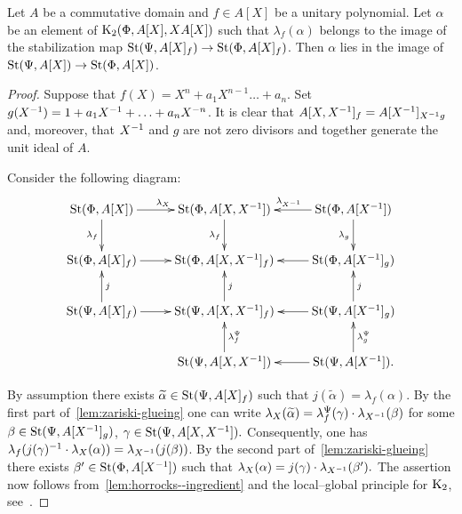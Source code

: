 \begin{lemma} \label{lem:horrocks-b}
 Let $A$ be a commutative domain and $f \in A[X]$ be a unitary polynomial.
 Let $\alpha$ be an element of $\operatorname{K}_2(\Phi, A[X], XA[X])$ such that $\lambda_f(\alpha)$ belongs to the image of the stabilization map
 $\operatorname{St}(\Psi, A[X]_f) \to \operatorname{St}(\Phi, A[X]_f)$.
 Then $\alpha$ lies in the image of $\operatorname{St}(\Psi, A[X]) \to \operatorname{St}(\Phi, A[X])$.
\end{lemma}
\begin{proof}
    Suppose that $f(X) = X^n + a_1 X^{n-1} \ldots + a_n$.
    Set $g(X^{-1}) = 1 + a_1 X^{-1} + \ldots + a_{n} X^{-n}$.
    It is clear that $A[X, X^{-1}]_f = A[X^{-1}]_{X^{-1} g}$ and, moreover, that $X^{-1}$ and $g$ are not zero divisors and together generate the unit ideal of $A$.

    Consider the following diagram:
    \[ \xymatrix{\St(\Phi, A[X]) \ar[r]^{\lambda_X} \ar[d]_{\lambda_f} & \St(\Phi, A[X, X\inv]) \ar[d]_{\lambda_f}  & \St(\Phi, A[X\inv]) \ar[l]_{\lambda_{X\inv}} \ar[d]_{\lambda_g}  \\
                 \St(\Phi, A[X]_f) \ar[r] & \St(\Phi, A[X, X\inv]_f) & \St(\Phi, A[X\inv]_g) \ar[l] \\
                 \St(\Psi, A[X]_f) \ar[r] \ar[u]_j & \St(\Psi, A[X, X\inv]_f) \ar[u]_j & \St(\Psi, A[X\inv]_g) \ar[l] \ar[u]_j \\
                                   & \St(\Psi, A[X, X\inv]) \ar[u]_{\lambda_f^\Psi}   & \St(\Psi, A[X\inv]). \ar[l] \ar[u]_{\lambda_g^\Psi}}\]

    By assumption there exists $\widetilde{\alpha} \in \operatorname{St}(\Psi, A[X]_f)$ such that $j(\widetilde{\alpha}) = \lambda_f(\alpha)$.
    By the first part of~\cref{lem:zariski-glueing} one can write $\lambda_X(\widetilde{\alpha}) = \lambda_f^\Psi(\gamma) \cdot \lambda_{X^{-1}}(\beta)$
     for some $\beta \in \operatorname{St}(\Psi, A[X^{-1}]_g)$, $\gamma \in \operatorname{St}(\Psi, A[X, X^{-1}]).$
    Consequently, one has $\lambda_f(j(\gamma)^{-1} \cdot \lambda_X(\alpha)) = \lambda_{X^{-1}}(j(\beta))$.
    By the second part of~\cref{lem:zariski-glueing} there exists $\beta' \in \operatorname{St}(\Phi, A[X^{-1}])$ such that $\lambda_X(\alpha) = j(\gamma) \cdot \lambda_{X^{-1}}(\beta').$
    The assertion now follows from~\cref{lem:horrocks--ingredient} and the local--global principle for $\operatorname{K}_2$, see~\cite{LS17}. %
\end{proof}


